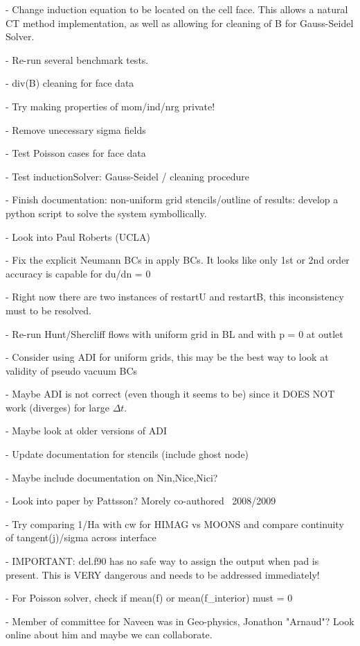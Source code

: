 \documentclass[11pt]{article}
\begin{document}
- Change induction equation to be located on the cell face. This allows a natural CT method implementation, as well as allowing for cleaning of B for Gauss-Seidel Solver.

- Re-run several benchmark tests.

- div(B) cleaning for face data

- Try making properties of mom/ind/nrg private!

- Remove unecessary sigma fields

- Test Poisson cases for face data

- Test inductionSolver: Gauss-Seidel / cleaning procedure

- Finish documentation: non-uniform grid stencils/outline of results: develop a python script to solve the system symbollically.

- Look into Paul Roberts (UCLA)

- Fix the explicit Neumann BCs in apply BCs. It looks like only 1st or 2nd order accuracy is capable for du/dn = 0

- Right now there are two instances of restartU and restartB, this inconsistency must to be resolved.

- Re-run Hunt/Shercliff flows with uniform grid in BL and with p = 0 at outlet

- Consider using ADI for uniform grids, this may be the best way to look at validity of pseudo vacuum BCs

- Maybe ADI is not correct (even though it seems to be) since it DOES NOT work (diverges) for large $\Delta t$.

- Maybe look at older versions of ADI

- Update documentation for stencils (include ghost node)

- Maybe include documentation on Nin,Nice,Nici?

- Look into paper by Pattsson? Morely co-authored ~2008/2009

- Try comparing 1/Ha with cw for HIMAG vs MOONS and compare continuity of tangent(j)/sigma across interface

- IMPORTANT: del.f90 has no safe way to assign the output when pad is present. This is VERY dangerous and needs to be addressed immediately!

- For Poisson solver, check if mean(f) or mean(f\_interior) must = 0

- Member of committee for Naveen was in Geo-physics, Jonathon "Arnaud"? Look online about him and maybe we can collaborate.
\end{document}
